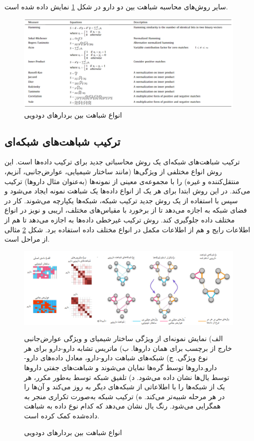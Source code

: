 سایر روش‌های محاسبه شباهت بین دو دارو در شکل
\ref{fs7}
نمایش داده شده ‌است.
\begin{figure}[!h]
	\centering
	\includegraphics[scale=0.63]{section1/sims.png}
	\caption{انواع شباهت بین بردارهای دودویی}
	\label{fs7}
\end{figure}

\subsection{ترکیب شباهت‌های شبکه‌ای
\label{SNF}}

ترکیب شباهت‌های شبکه‌ای
\cite{Wang2014}
یک روش محاسباتی جدید برای ترکیب داده‌ها است. این روش انواع مختلفی از ویژگی‌ها (مانند ساختار شیمیایی، عوارض‌جانبی، آنزیم، منتقل‌کننده و غیره) را با مجموعه‌ی معینی از نمونه‌ها (به‌عنوان مثال داروها) ترکیب می‌کند. در این روش ابتدا برای هر یک از انواع داده‌ها یک شباهت نمونه ایجاد می‌شود و سپس با استفاده از یک روش جدید ترکیب شبکه،‌ شبکه‌ها یکپارچه می‌شوند. کار در فضای شبکه به
اجازه می‌دهد تا از برخورد با مقیاس‌های مختلف، اریبی
 و نویز در انواع مختلف داده جلوگیری کند. روش ترکیب غیرخطی داده‌ها به
اجازه می‌دهد تا هم از اطلاعات رایج و هم از اطلاعات مکمل در انواع مختلف داده استفاده برد. شکل
\ref{fs8}
مثالی از مراحل
است.
 

\begin{figure}[!h]
	\includegraphics[scale=0.57]{section2/SNF.png}
	\caption{انواع شباهت بین بردارهای دودویی
    \cite{Wang2014}}
الف) نمایش نمونه‌ای از ویژگی ساختار شیمیای و ویژگی عوارض‌جانبی خارج از برچسب برای همان داروها. ب) ماتریس تشابه دارو-دارو برای هر نوع ویژگی. ج) شبکه‌های شباهت دارو-دارو، معادل داده‌های دارو-دارو.داروها توسط گره‌ها نمایان می‌شوند و شباهت‌های جفتی داروها توسط یال‌ها نشان داده ‌می‌شود. د) تلفیق شبکه توسط
به‌طور مکرر، هر یک از شبکه‌ها را با اطلاعاتی از شبکه‌های دیگر به روز می‌کند و آن‌ها را در هر مرحله شبیه‌تر می‌کند. ه) ترکیب شبکه به‌صورت تکراری منجر به همگرایی می‌شود. رنگ یال نشان می‌دهد که کدام نوع داده به شباهت داده‌شده کمک کرده ‌است.
	\label{fs8}
\end{figure}

